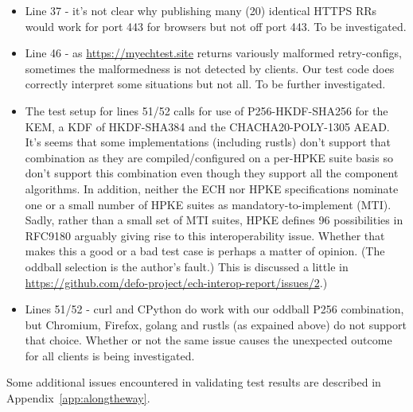 \begin{itemize}
    \item Line 37 - it's not clear why publishing many (20) identical HTTPS RRs
        would work for port 443 for browsers but not off port 443. To be
        investigated.

    \item Line 46 - as \url{https://myechtest.site} returns variously malformed
        retry-configs, sometimes the malformedness is not detected by clients.
        Our test code does correctly interpret some situations but not all.
        To be further investigated.

    \item The test setup for lines 51/52 calls for use of P256-HKDF-SHA256 for
        the KEM, a KDF of HKDF-SHA384 and the CHACHA20-POLY-1305 AEAD.  It's
        seems that some implementations (including rustls) don't support that
        combination as they are compiled/configured on a per-HPKE suite basis
        so don't support this combination even though they support all the
        component algorithms.  In addition, neither the ECH nor HPKE
        specifications nominate one or a small number of HPKE suites as
        mandatory-to-implement (MTI).  Sadly, rather than a small set of MTI
        suites, HPKE defines 96 possibilities in RFC9180 \cite{rfc9180}
        arguably giving rise to this interoperability issue.  Whether that
        makes this a good or a bad test case is perhaps a matter of opinion.
        (The oddball selection is the author's fault.) This is discussed a
        little in
        \url{https://github.com/defo-project/ech-interop-report/issues/2}.)

    \item Lines 51/52 - curl and CPython do work with our oddball P256
        combination, but Chromium, Firefox, golang and rustls (as expained above)
        do not support that choice. Whether or not the same issue causes the
        unexpected outcome for all clients is being investigated.

\end{itemize}

Some additional issues encountered in validating test results are described
in Appendix~\ref{app:alongtheway}.

